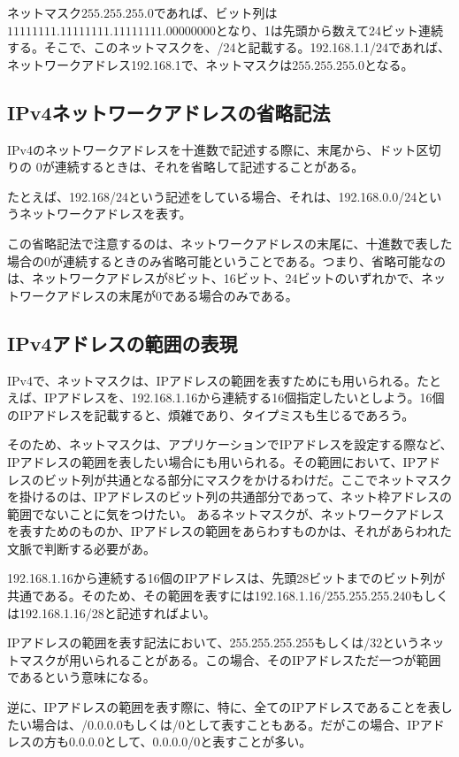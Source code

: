 ネットマスク$255.255.255.0$であれば、ビット列は$11111111.11111111.11111111.00000000$となり、1は先頭から数えて24ビット連続する。そこで、このネットマスクを、/24と記載する。192.168.1.1/24であれば、ネットワークアドレス192.168.1で、ネットマスクは$255.255.255.0$となる。

\subsection{IPv4ネットワークアドレスの省略記法}
IPv4のネットワークアドレスを十進数で記述する際に、末尾から、ドット区切りの
0が連続するときは、それを省略して記述することがある。

たとえば、192.168/24という記述をしている場合、それは、192.168.0.0/24というネットワークアドレスを表す。

この省略記法で注意するのは、ネットワークアドレスの末尾に、十進数で表した場合の0が連続するときのみ省略可能ということである。つまり、省略可能なのは、ネットワークアドレスが8ビット、16ビット、24ビットのいずれかで、ネットワークアドレスの末尾が0である場合のみである。



\subsection{IPv4アドレスの範囲の表現}
IPv4で、ネットマスクは、IPアドレスの範囲を表すためにも用いられる。たとえば、IPアドレスを、192.168.1.16から連続する16個指定したいとしよう。16個のIPアドレスを記載すると、煩雑であり、タイプミスも生じるであろう。

そのため、ネットマスクは、アプリケーションでIPアドレスを設定する際など、IPアドレスの範囲を表したい場合にも用いられる。その範囲において、IPアドレスのビット列が共通となる部分にマスクをかけるわけだ。ここでネットマスクを掛けるのは、IPアドレスのビット列の共通部分であって、ネット枠アドレスの範囲でないことに気をつけたい。
あるネットマスクが、ネットワークアドレスを表すためのものか、IPアドレスの範囲をあらわすものかは、それがあらわれた文脈で判断する必要があ。

192.168.1.16から連続する16個のIPアドレスは、先頭28ビットまでのビット列が共通である。そのため、その範囲を表すには192.168.1.16/255.255.255.240もしくは192.168.1.16/28と記述すればよい。

IPアドレスの範囲を表す記法において、255.255.255.255もしくは/32というネットマスクが用いられることがある。この場合、そのIPアドレスただ一つが範囲であるという意味になる。

逆に、IPアドレスの範囲を表す際に、特に、全てのIPアドレスであることを表したい場合は、/0.0.0.0もしくは/0として表すこともある。だがこの場合、IPアドレスの方も0.0.0.0として、0.0.0.0/0と表すことが多い。

